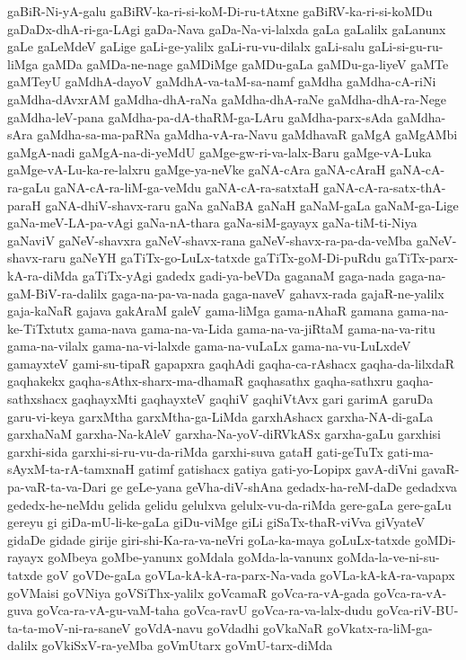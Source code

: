 {gaBiR-Ni-yA-galu
gaBiRV-ka-ri-si-koM-Di-ru-tAtxne
gaBiRV-ka-ri-si-koMDu
gaDaDx-dhA-ri-ga-LAgi
gaDa-Nava
gaDa-Na-vi-lalxda
gaLa
gaLalilx
gaLanunx
gaLe
gaLeMdeV
gaLige
gaLi-ge-yalilx
gaLi-ru-vu-dilalx
gaLi-salu
gaLi-si-gu-ru-liMga
gaMDa
gaMDa-ne-nage
gaMDiMge
gaMDu-gaLa
gaMDu-ga-liyeV
gaMTe
gaMTeyU
gaMdhA-dayoV
gaMdhA-va-taM-sa-namf
gaMdha
gaMdha-cA-riNi
gaMdha-dAvxrAM
gaMdha-dhA-raNa
gaMdha-dhA-raNe
gaMdha-dhA-ra-Nege
gaMdha-leV-pana
gaMdha-pa-dA-thaRM-ga-LAru
gaMdha-parx-sAda
gaMdha-sAra
gaMdha-sa-ma-paRNa
gaMdha-vA-ra-Navu
gaMdhavaR
gaMgA
gaMgAMbi
gaMgA-nadi
gaMgA-na-di-yeMdU
gaMge-gw-ri-va-lalx-Baru
gaMge-vA-Luka
gaMge-vA-Lu-ka-re-lalxru
gaMge-ya-neVke
gaNA-cAra
gaNA-cAraH
gaNA-cA-ra-gaLu
gaNA-cA-ra-liM-ga-veMdu
gaNA-cA-ra-satxtaH
gaNA-cA-ra-satx-thA-paraH
gaNA-dhiV-shavx-raru
gaNa
gaNaBA
gaNaH
gaNaM-gaLa
gaNaM-ga-Lige
gaNa-meV-LA-pa-vAgi
gaNa-nA-thara
gaNa-siM-gayayx
gaNa-tiM-ti-Niya
gaNaviV
gaNeV-shavxra
gaNeV-shavx-rana
gaNeV-shavx-ra-pa-da-veMba
gaNeV-shavx-raru
gaNeYH
gaTiTx-go-LuLx-tatxde
gaTiTx-goM-Di-puRdu
gaTiTx-parx-kA-ra-diMda
gaTiTx-yAgi
gadedx
gadi-ya-beVDa
gaganaM
gaga-nada
gaga-na-gaM-BiV-ra-dalilx
gaga-na-pa-va-nada
gaga-naveV
gahavx-rada
gajaR-ne-yalilx
gaja-kaNaR
gajava
gakAraM
galeV
gama-liMga
gama-nAhaR
gamana
gama-na-ke-TiTxtutx
gama-nava
gama-na-va-Lida
gama-na-va-jiRtaM
gama-na-va-ritu
gama-na-vilalx
gama-na-vi-lalxde
gama-na-vuLaLx
gama-na-vu-LuLxdeV
gamayxteV
gami-su-tipaR
gapapxra
gaqhAdi
gaqha-ca-rAshacx
gaqha-da-lilxdaR
gaqhakekx
gaqha-sAthx-sharx-ma-dhamaR
gaqhasathx
gaqha-sathxru
gaqha-sathxshacx
gaqhayxMti
gaqhayxteV
gaqhiV
gaqhiVtAvx
gari
garimA
garuDa
garu-vi-keya
garxMtha
garxMtha-ga-LiMda
garxhAshacx
garxha-NA-di-gaLa
garxhaNaM
garxha-Na-kAleV
garxha-Na-yoV-diRVkASx
garxha-gaLu
garxhisi
garxhi-sida
garxhi-si-ru-vu-da-riMda
garxhi-suva
gataH
gati-geTuTx
gati-ma-sAyxM-ta-rA-tamxnaH
gatimf
gatishacx
gatiya
gati-yo-Lopipx
gavA-diVni
gavaR-pa-vaR-ta-va-Dari
ge
geLe-yana
geVha-diV-shAna
gedadx-ha-reM-daDe
gedadxva
gededx-he-neMdu
gelida
gelidu
gelulxva
gelulx-vu-da-riMda
gere-gaLa
gere-gaLu
gereyu
gi
giDa-mU-li-ke-gaLa
giDu-viMge
giLi
giSaTx-thaR-viVva
giVyateV
gidaDe
gidade
girije
giri-shi-Ka-ra-va-neVri
goLa-ka-maya
goLuLx-tatxde
goMDi-rayayx
goMbeya
goMbe-yanunx
goMdala
goMda-la-vanunx
goMda-la-ve-ni-su-tatxde
goV
goVDe-gaLa
goVLa-kA-kA-ra-parx-Na-vada
goVLa-kA-kA-ra-vapapx
goVMaisi
goVNiya
goVSiThx-yalilx
goVcamaR
goVca-ra-vA-gada
goVca-ra-vA-guva
goVca-ra-vA-gu-vaM-taha
goVca-ravU
goVca-ra-va-lalx-dudu
goVca-riV-BU-ta-ta-moV-ni-ra-saneV
goVdA-navu
goVdadhi
goVkaNaR
goVkatx-ra-liM-ga-dalilx
goVkiSxV-ra-yeMba
goVmUtarx
goVmU-tarx-diMda
}
